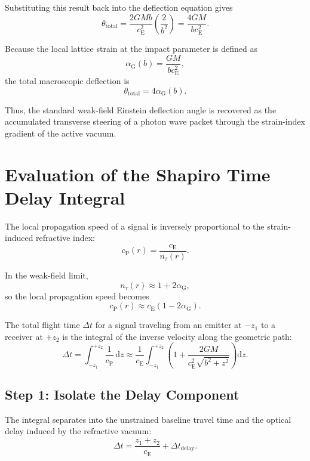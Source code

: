 Substituting this result back into the deflection equation gives
\begin{equation}
    \theta_{\mathrm{total}} = \frac{2GMb}{c_{\mathrm{E}}^2} \left( \frac{2}{b^2} \right) = \frac{4GM}{bc_{\mathrm{E}}^2}.
\end{equation}

Because the local lattice strain at the impact parameter is defined as
\begin{equation}
    \alpha_{\mathrm{G}}(b) = \frac{GM}{bc_{\mathrm{E}}^2},
\end{equation}
the total macroscopic deflection is
\begin{equation}
    \theta_{\mathrm{total}} = 4\alpha_{\mathrm{G}}(b).
\end{equation}

Thus, the standard weak-field Einstein deflection angle is recovered as the accumulated transverse steering of a photon wave packet through the strain-index gradient of the active vacuum.

\section{Evaluation of the Shapiro Time Delay Integral}
The local propagation speed of a signal is inversely proportional to the strain-induced refractive index:
\begin{equation}
    c_{\mathrm{P}}(r) = \frac{c_{\mathrm{E}}}{n_\tau(r)}.
\end{equation}

In the weak-field limit,
\begin{equation}
    n_\tau(r) \approx 1+2\alpha_{\mathrm{G}},
\end{equation}
so the local propagation speed becomes
\begin{equation}
    c_{\mathrm{P}}(r) \approx c_{\mathrm{E}} \left( 1-2\alpha_{\mathrm{G}} \right).
\end{equation}

The total flight time $\Delta t$ for a signal traveling from an emitter at $-z_1$ to a receiver at $+z_2$ is the integral of the inverse velocity along the geometric path:
\begin{equation}
    \Delta t = \int_{-z_1}^{+z_2} \frac{1}{c_{\mathrm{P}}} \,\mathrm{d}z \approx \frac{1}{c_{\mathrm{E}}} \int_{-z_1}^{+z_2} \left( 1+ \frac{2GM}{c_{\mathrm{E}}^2\sqrt{b^2+z^2}} \right) \mathrm{d}z.
\end{equation}

\subsection{Step 1: Isolate the Delay Component}
The integral separates into the unstrained baseline travel time and the optical delay induced by the refractive vacuum:
\begin{equation}
    \Delta t = \frac{z_1+z_2}{c_{\mathrm{E}}} + \Delta t_{\mathrm{delay}}.
\end{equation}

